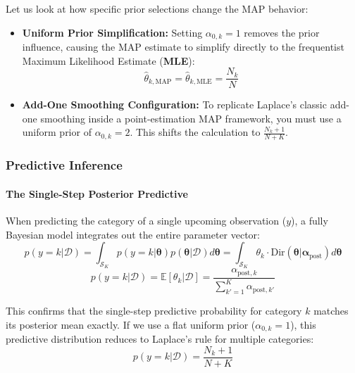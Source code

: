 \documentclass{article}
\begin{document}
Let us look at how specific prior selections change the MAP behavior:
\begin{itemize}
    \item \textbf{Uniform Prior Simplification:} Setting $\alpha_{0,k} = 1$ removes the prior influence, causing the MAP estimate to simplify directly to the frequentist Maximum Likelihood Estimate (\textbf{MLE}):
    \begin{equation}
    \hat{\theta}_{k,\text{MAP}} = \hat{\theta}_{k,\text{MLE}} = \frac{N_k}{N}
    \end{equation}
    \item \textbf{Add-One Smoothing Configuration:} To replicate Laplace's classic add-one smoothing inside a point-estimation MAP framework, you must use a uniform prior of $\alpha_{0,k} = 2$. This shifts the calculation to $\frac{N_k+1}{N+K}$.
\end{itemize}

\subsubsection{Predictive Inference}

\paragraph{The Single-Step Posterior Predictive}
When predicting the category of a single upcoming observation ($y$), a fully Bayesian model integrates out the entire parameter vector:
\begin{equation}
p(y = k|\mathcal{D}) = \int_{\mathcal{S}_K} p(y = k|\boldsymbol{\theta})p(\boldsymbol{\theta}|\mathcal{D})d\boldsymbol{\theta} = \int_{\mathcal{S}_K} \theta_k \cdot \text{Dir}(\boldsymbol{\theta}|\boldsymbol{\alpha}_{\text{post}})d\boldsymbol{\theta}
\end{equation}
\begin{equation}
p(y = k|\mathcal{D}) = \mathbb{E}[\theta_k|\mathcal{D}] = \frac{\alpha_{\text{post},k}}{\sum_{k'=1}^K \alpha_{\text{post},k'}}
\end{equation}

This confirms that the single-step predictive probability for category $k$ matches its posterior mean exactly. If we use a flat uniform prior ($\alpha_{0,k}=1$), this predictive distribution reduces to Laplace's rule for multiple categories:
\begin{equation}
p(y = k|\mathcal{D}) = \frac{N_k + 1}{N + K}
\end{equation}
\end{document}
